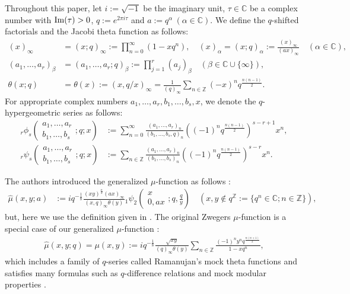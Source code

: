 \documentclass[a4paper]{article}
\newcommand{\Zz}{\mathbb{Z}}
\newcommand{\Cz}{\mathbb{C}}
\newcommand{\hyper}[4]{\left( \begin{matrix} #1 \\ #2 \end{matrix};#3;#4\right)}
\numberwithin{equation}{section}
\theoremstyle{plain}
\begin{document}
Throughout this paper, let $i:=\sqrt{-1}$ be the imaginary unit, $\tau\in\Cz$ be a complex number with ${\rm Im}(\tau)>0$, $q:=e^{2\pi i\tau}$ and $a:=q^\alpha\ (\alpha\in\Cz)$. 
We define the $q$-shifted factorials and the Jacobi theta function as follows: 
\begin{align*}
(x)_\infty
  &=
  (x;q)_\infty
  :=
  \prod_{n=0}^\infty(1-x q^n), \quad  
  (x)_\alpha
  =
  (x;q)_\alpha
  :=
  \frac{(x)_\infty}{(a x)_\infty}\quad (\alpha\in\Cz), 
  \\
  (a_1,\ldots,a_r)_\beta
  &=
  (a_1,\ldots,a_r;q)_\beta
  :=
  \prod_{j=1}^r(a_j)_\beta
  \quad (\beta\in\Cz\cup\{\infty\}), 
  \\
\theta(x;q)&=\theta(x):=(x,q/x)_\infty=\frac{1}{(q)_\infty}\sum_{n\in\Zz}(-x)^nq^\frac{n(n-1)}{2}. 
\end{align*}
For appropriate complex numbers $a_1,\ldots,a_r,b_1,\ldots,b_s,x$, we denote the $q$-hypergeometric series as follows: 
\begin{align*}
{}_r\phi_s\hyper{a_1,\ldots,a_r}{b_1,\ldots,b_s}{q}{x}
  &:=
  \sum_{n=0}^\infty
  \frac{(a_1,\ldots,a_r)_n}{(b_1,\ldots,b_s,q)_n}
    \left((-1)^nq^\frac{n(n-1)}{2}\right)^{s-r+1} x^n
    , \\
{}_r\psi_s\hyper{a_1,\ldots,a_r}{b_1,\ldots,b_s}{q}{x}
  &:=
  \sum_{n\in\Zz}
  \frac{(a_1,\ldots,a_r)_n}{(b_1,\ldots,b_s)_n}
    \left((-1)^nq^\frac{n(n-1)}{2}\right)^{s-r} x^n. 
\end{align*}


The authors introduced the generalized $\mu$-function as follows \cite{ST1}:
\begin{align}
\label{eq: defi of gmu}
\widehat{\mu}(x,y;a)
   &:=
   iq^{-\frac{1}{8}}
   \frac{(xy)^{\frac{\alpha}{2} }(ax)_{\infty }}{(x,q)_{\infty }\theta (y)}
   {}_1\psi_2\left(\begin{matrix} x \\ 0,ax \end{matrix};q,\frac{q}{y}\right)\quad (x,y\not\in q^{\Zz}:=\{q^n\in\Cz; n\in\Zz\}),
\end{align}
but, here we use the definition given in \cite{ST2}. 
The original Zwegers $\mu$-function \cite{Zw1} is a special case of our generalized $\mu$-function : 
\begin{align*}
\widehat{\mu}(x,y;q)=\mu(x,y):=iq^{-\frac{1}{8}}\frac{\sqrt{xy}}{(q)_\infty\theta(y)}\sum_{n\in\Zz}\frac{(-1)^ny^nq^\frac{n(n+1)}{2}}{1-x q^n}, 
\end{align*}
which includes a family of $q$-series called Ramanujan's mock theta functions and satisfies many formulas such as $q$-difference relations and mock modular properties \cite{BFOR}. 
\end{document}
